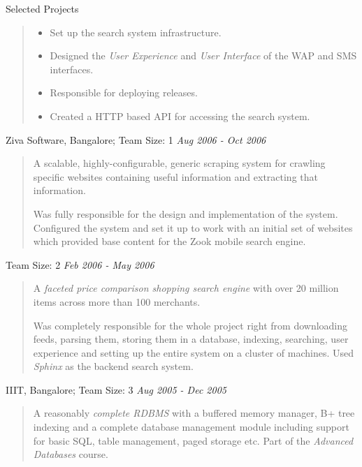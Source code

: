 \documentclass{resume}
\newcommand{\period}{\hfill\small\sl}
\newcommand{\teamsize}{\sc\footnotesize Team Size: }
\begin{document}
\begin{category}{Selected Projects}
\begin{quotation}
        \begin{itemize}
            \item Set up the search system infrastructure.
            \item Designed the {\em User Experience} and {\em User Interface}
                of the WAP and SMS interfaces.
            \item Responsible for deploying releases.
            \item Created a HTTP based API for accessing the search system.
        \end{itemize}
    \end{quotation}

     Ziva Software, Bangalore;
    {\teamsize 1}
    {\period Aug 2006 - Oct 2006}
    \begin{quotation}
        A scalable, highly-configurable, generic scraping system for crawling
        specific websites containing useful information and extracting that
        information.

        Was fully responsible for the design and implementation of the system.
        Configured the system and set it up to work with an initial set of
        websites which provided base content for the Zook mobile search engine.
    \end{quotation}

    {\teamsize 2}
    {\period Feb 2006 - May 2006}
    \begin{quotation}
        A {\em faceted price comparison shopping search engine} with over 20
        million items across more than 100 merchants.

        Was completely responsible for the whole project right from downloading
        feeds, parsing them, storing them in a database, indexing, searching,
        user experience and setting up the entire system on a cluster of
        machines. Used {\em Sphinx} as the backend search system.
    \end{quotation}

     IIIT, Bangalore;
    {\teamsize 3}
    {\period Aug 2005 - Dec 2005}
    \begin{quotation}
        A reasonably {\em complete RDBMS} with a buffered memory manager, B+
        tree indexing and a complete database management module including
        support for basic SQL, table management, paged storage etc. Part of the
        {\em Advanced Databases} course.
    \end{quotation}


\end{category}
\end{document}
